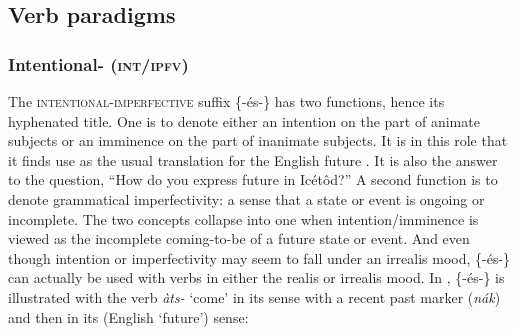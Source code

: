 \newpage 
\subsection{Verb paradigms}\label{sec:8.10}
\subsubsection{Intentional- (\textsc{int/ipfv})}\label{sec:8.10.1}

The \textsc{intentional-imperfective}  suffix \{-és-\} has two functions, hence its hyphenated title. One is to denote either an intention on the part of animate subjects or an imminence on the part of inanimate subjects. It is in this role that it finds use as the usual translation for the English future . It is also the answer to the question, “How do you express future  in Icétôd?” A second function is to denote grammatical imperfectivity: a sense that a state or event is ongoing or incomplete. The two concepts collapse into one when intention/imminence is viewed as the incomplete coming-to-be of a future state or event.  And even though intention or imperfectivity may seem to fall under an irrealis mood, \{-és-\} can actually be used with verbs in either the realis or irrealis mood. In , \{-és-\} is illustrated with the verb \textit{àts-} ‘come’ in its  sense with a recent past  marker (\textit{nák\ᵃ}) and then in its  (English `future') sense:


